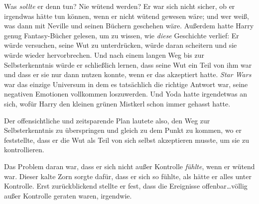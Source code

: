 Was \emph{sollte} er denn tun? Nie wütend werden? Er war sich nicht sicher, ob er irgendwas hätte tun können, wenn er nicht wütend gewesen wäre; und wer weiß, was dann mit Neville und seinen Büchern geschehen wäre. Außerdem hatte Harry genug Fantasy-Bücher gelesen, um zu wissen, wie \emph{diese} Geschichte verlief: Er würde versuchen, seine Wut zu unterdrücken, würde daran scheitern und sie würde wieder hervorbrechen. Und nach einem langen Weg bis zur Selbsterkenntnis würde er schließlich lernen, dass seine Wut ein Teil von ihm war und dass er sie nur dann nutzen konnte, wenn er das akzeptiert hatte. \emph{Star Wars} war das einzige Universum in dem es tatsächlich die richtige Antwort war, seine negativen Emotionen vollkommen loszuwerden. Und Yoda hatte irgendetwas an sich, wofür Harry den kleinen grünen Mistkerl schon immer gehasst hatte.

Der offensichtliche und zeitsparende Plan lautete also, den Weg zur Selbsterkenntnis zu überspringen und gleich zu dem Punkt zu kommen, wo er feststellte, dass er die Wut als Teil von sich selbst akzeptieren musste, um sie zu kontrollieren.

Das Problem daran war, dass er sich nicht außer Kontrolle \emph{fühlte}, wenn er wütend war. Dieser kalte Zorn sorgte dafür, dass er sich so fühlte, als hätte er alles unter Kontrolle. Erst zurückblickend stellte er fest, dass die Ereignisse offenbar…völlig außer Kontrolle geraten waren, irgendwie.

